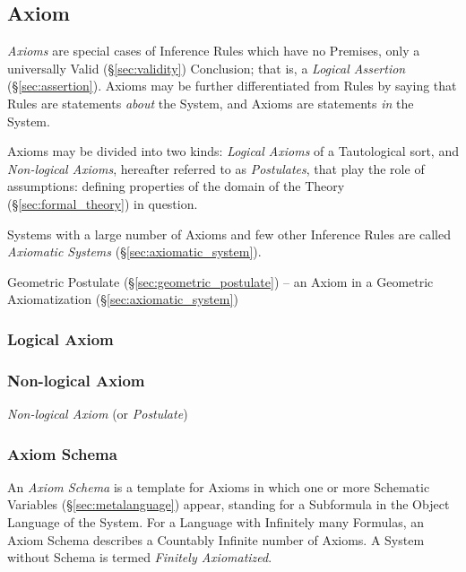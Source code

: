\subsection{Axiom}\label{sec:axiom}

\emph{Axioms} are special cases of Inference Rules which have no
Premises, only a universally Valid (\S\ref{sec:validity}) Conclusion;
that is, a \emph{Logical Assertion} (\S\ref{sec:assertion}). Axioms
may be further differentiated from Rules by saying that Rules are
statements \emph{about} the System, and Axioms are statements
\emph{in} the System.

Axioms may be divided into two kinds: \emph{Logical Axioms} of a
Tautological sort, and \emph{Non-logical Axioms}, hereafter referred
to as \emph{Postulates}, that play the role of assumptions: defining
properties of the domain of the Theory (\S\ref{sec:formal_theory}) in
question.

Systems with a large number of Axioms and few other Inference Rules
are called \emph{Axiomatic Systems} (\S\ref{sec:axiomatic_system}).

\fist Geometric Postulate (\S\ref{sec:geometric_postulate}) -- an Axiom in a
Geometric Axiomatization (\S\ref{sec:axiomatic_system})



\subsubsection{Logical Axiom}\label{sec:logical_axiom}

\subsubsection{Non-logical Axiom}\label{sec:nonlogical_axiom}

\emph{Non-logical Axiom} (or \emph{Postulate})



\subsubsection{Axiom Schema}\label{sec:axiom_schema}

An \emph{Axiom Schema} is a template for Axioms in which one or more Schematic
Variables (\S\ref{sec:metalanguage}) appear, standing for a Subformula in the
Object Language of the System. For a Language with Infinitely many Formulas, an
Axiom Schema describes a Countably Infinite number of Axioms. A System without
Schema is termed \emph{Finitely Axiomatized}.

